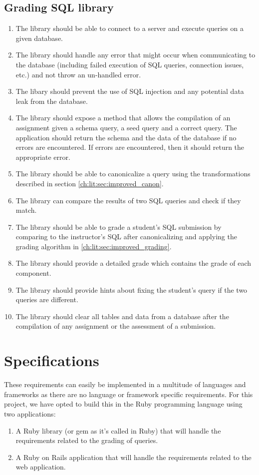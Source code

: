 \subsection{Grading SQL library}
\begin{enumerate}[label=G-\arabic*]
  \item The library should be able to connect to a  server and execute queries on a given database.
  \item The library should handle any error that might occur when communicating to the database (including failed execution of SQL queries, connection issues, etc.) and not throw an un-handled error.
  \item The libary should prevent the use of SQL injection and any potential data leak from the database.
  \item The library should expose a method that allows the compilation of an assignment given a schema query, a seed query and a correct query. The application should return the schema and the data of the database if no errors are encountered. If errors are encountered, then it should return the appropriate error.
  \item The library should be able to canonicalize a query using the transformations described in section \ref{ch:lit:sec:improved_canon}.
  \item The library can compare the results of two SQL queries and check if they match.
  \item The library should be able to grade a student's SQL submission by comparing to the instructor's SQL after canonicalizing and applying the grading algorithm in \ref{ch:lit:sec:improved_grading}.
  \item The library should provide a detailed grade which contains the grade of each component.
  \item The library should provide hints about fixing the student's query if the two queries are different.
  \item The library should clear all tables and data from a database after the compilation of any assignment or the assessment of a submission.
\end{enumerate}

\section{Specifications} \label{ch:reqandspec:sec:spec}

These requirements can easily be implemented in a multitude of languages and frameworks as there are no language or framework specific requirements. For this project, we have opted to build this in the Ruby programming language using two applications:
\begin{enumerate}
    \item A Ruby library (or gem as it's called in Ruby) that will handle the requirements related to the grading of queries.
    \item A Ruby on Rails application that will handle the requirements related to the web application.
\end{enumerate}

